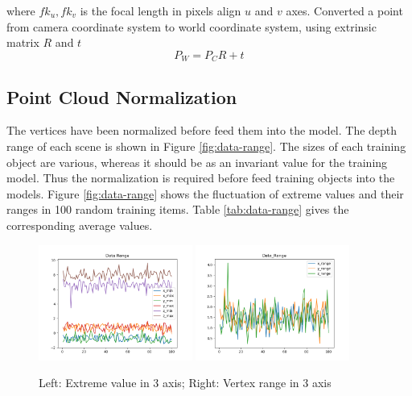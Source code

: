 where $ fk_u, fk_v $ is the focal length in pixels align $ u $ and $ v $ axes.
Converted a point from camera coordinate system to world coordinate system, using extrinsic matrix $ R $ and $ t $
\[P_W = P_CR+t \]

\subsection{Point Cloud Normalization}


\label{sec:dataset-normalization}

The vertices have been normalized before feed them into the model. The depth range of each scene is shown in Figure \ref{fig:data-range}.
The sizes of each training object are various, whereas it should be as an invariant value for the training model. Thus the normalization is required before feed training objects into the models. Figure \ref{fig:data-range} shows the fluctuation of extreme values and their ranges in 100 random training items. Table \ref{tab:data-range} gives the corresponding average values.
\begin{figure}[!h]
	\centering
	{\includegraphics[width=0.45\textwidth]{./Figures/Data_Extreme.png}}
	{\includegraphics[width=0.45\textwidth]{./Figures/Data_Range.png}}
	\label{fig:data_range}
	\caption{Left: Extreme value in 3 axis; Right: Vertex range in 3 axis}
\end{figure}

